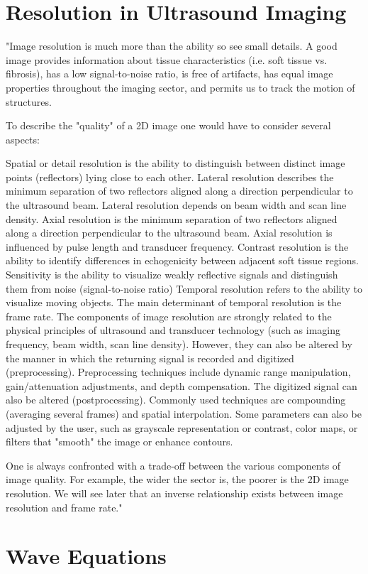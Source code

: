 \section{Resolution in Ultrasound Imaging}

"Image resolution is much more than the ability so see small details. A good image provides information about tissue characteristics (i.e. soft tissue vs. fibrosis), has a low signal-to-noise ratio, is free of artifacts, has equal image properties throughout the imaging sector, and permits us to track the motion of structures.

To describe the "quality" of a 2D image one would have to consider several aspects:

Spatial or detail resolution is the ability to distinguish between distinct image points (reflectors) lying close to each other.
Lateral resolution describes the minimum separation of two reflectors aligned along a direction perpendicular to the ultrasound beam. Lateral resolution depends on beam width and scan line density.
Axial resolution is the minimum separation of two reflectors aligned along a direction perpendicular to the ultrasound beam. Axial resolution is influenced by pulse length and transducer frequency.
Contrast resolution is the ability to identify differences in echogenicity between adjacent soft tissue regions.
Sensitivity is the ability to visualize weakly reflective signals and distinguish them from noise (signal-to-noise ratio)
Temporal resolution refers to the ability to visualize moving objects. The main determinant of temporal resolution is the frame rate.
The components of image resolution are strongly related to the physical principles of ultrasound and transducer technology (such as imaging frequency, beam width, scan line density). However, they can also be altered by the manner in which the returning signal is recorded and digitized (preprocessing). Preprocessing techniques include dynamic range manipulation, gain/attenuation adjustments, and depth compensation. The digitized signal can also be altered (postprocessing). Commonly used techniques are compounding (averaging several frames) and spatial interpolation. Some parameters can also be adjusted by the user, such as grayscale representation or contrast, color maps, or filters that "smooth" the image or enhance contours.

One is always confronted with a trade-off between the various components of image quality. For example, the wider the sector is, the poorer is the 2D image resolution. We will see later that an inverse relationship exists between image resolution and frame rate."





\section{Wave Equations}
